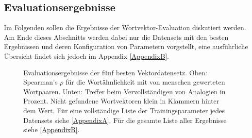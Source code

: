   \subsection{Evaluationsergebnisse}

  Im Folgenden sollen die Ergebnisse der Wortvektor-Evaluation diskutiert werden. Am Ende dieses Abschnitts werden dabei
  nur die Datensets mit den besten Ergebnissen und deren Konfiguration von Parametern vorgstellt, eine ausführliche
  Übersicht findet sich jedoch im Appendix \ref{AppendixB}.\\


  \begin{figure}[h]
    \centering


    \caption[Evaluationsergebnisse der besten Vektordatensets]{Evaluationsergebnisse der fünf besten Vektordatensetz. Oben:
    Spearman's $\rho$ für die Wortähnlichkeit mit von menschen gewerteten Wortpaaren. Unten: Treffer beim Vervollständigen
    von Analogien in Prozent. Nicht gefundene Wortvektoren klein in Klammern hinter dem Wert. Für eine vollständige Liste
    der Trainingsparameter jedes Datensets siehe \ref{AppendixA}. Für die gesamte Liste aller Ergebnisse siehe \ref{AppendixB}.}
  \end{figure}

